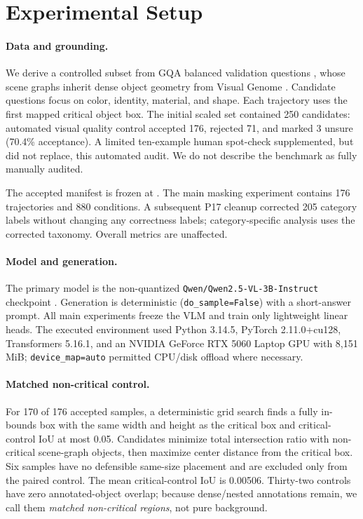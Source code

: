 \section{Experimental Setup}
\label{sec:setup}

\paragraph{Data and grounding.}
We derive a controlled subset from GQA balanced validation questions \citep{hudson2019gqa}, whose scene graphs inherit dense object geometry from Visual Genome \citep{krishna2016visualgenome}. Candidate questions focus on color, identity, material, and shape. Each trajectory uses the first mapped critical object box. The initial scaled set contained 250 candidates: automated visual quality control accepted 176, rejected 71, and marked 3 unsure (70.4\% acceptance). A limited ten-example human spot-check supplemented, but did not replace, this automated audit. We do not describe the benchmark as fully manually audited.

The accepted manifest is frozen at . The main masking experiment contains 176 trajectories and 880 conditions. A subsequent P17 cleanup corrected 205 category labels without changing any correctness labels; category-specific analysis uses the corrected taxonomy. Overall metrics are unaffected.

\paragraph{Model and generation.}
The primary model is the non-quantized \texttt{Qwen/Qwen2.5-VL-3B-Instruct} checkpoint \citep{bai2025qwen25vl}. Generation is deterministic (\texttt{do\_sample=False}) with a short-answer prompt. All main experiments freeze the VLM and train only lightweight linear heads. The executed environment used Python 3.14.5, PyTorch 2.11.0+cu128, Transformers 5.16.1, and an NVIDIA GeForce RTX 5060 Laptop GPU with 8,151 MiB; \texttt{device\_map=auto} permitted CPU/disk offload where necessary.

\paragraph{Matched non-critical control.}
For 170 of 176 accepted samples, a deterministic grid search finds a fully in-bounds box with the same width and height as the critical box and critical-control IoU at most 0.05. Candidates minimize total intersection ratio with non-critical scene-graph objects, then maximize center distance from the critical box. Six samples have no defensible same-size placement and are excluded only from the paired control. The mean critical-control IoU is 0.00506. Thirty-two controls have zero annotated-object overlap; because dense/nested annotations remain, we call them \emph{matched non-critical regions}, not pure background.

